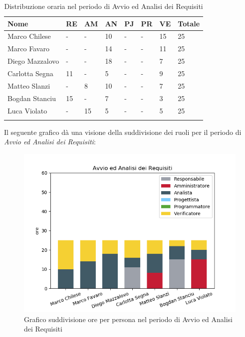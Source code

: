 \begin{longtable}{|C{.30\textwidth}|C{.06\textwidth}|C{.06\textwidth}|C{.06\textwidth} | C{.06\textwidth}| C{.06\textwidth} | C{.06\textwidth} | C{.10\textwidth} |}
\hline
\textbf{Nome} & \textbf{RE} & \textbf{AM} & \textbf{AN} & \textbf{PJ} & \textbf{PR} & \textbf{VE} & \textbf{Totale}\\
\hline 
Marco Chilese & - & - & 10 & - & - & 15 & 25 \\
\hline
Marco Favaro & - & - & 14 & - & - & 11 & 25 \\
\hline
Diego Mazzalovo & - & - & 18 & - & - & 7 & 25 \\
\hline
Carlotta Segna & 11 & - & 5 & - & - & 9 & 25 \\
\hline
Matteo Slanzi & - & 8 & 10 & - & - & 7 & 25 \\
\hline
Bogdan Stanciu & 15 & - & 7 & - & - & 3 & 25\\
\hline
Luca Violato & - & 15 & 5 & - & - & 5 & 25 \\
\hline


\caption{Distribuzione oraria nel periodo di Avvio ed Analisi dei Requisiti}
\label{tab:dist oraria aar}
\end{longtable}

Il seguente grafico dà una visione della suddivisione dei ruoli per il periodo di \textit{Avvio ed Analisi dei Requisiti}:

\begin{figure}[H]
	\centering
  		\includegraphics[width=1\linewidth]{./images/fig_aar.png}
  		\caption{Grafico suddivisione ore per persona nel periodo di Avvio ed Analisi dei Requisiti}
  		\label{fig:grafico suddivione ruoli aar}
\end{figure}



